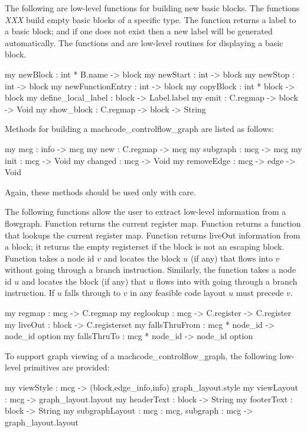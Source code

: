     The following are low-level functions for building new basic blocks.
The functions \emph{XXX} build empty basic blocks of a specific
type.  The function  returns a label to a basic block;
and if one does not exist then a new label will be generated automatically.
The functions  and  are low-level
routines for displaying a basic block.
\begin{SML}
   my newBlock          : int * B.name -> block      
   my newStart          : int -> block              
   my newStop           : int -> block             
   my newFunctionEntry  : int -> block            
   my copyBlock         : int * block -> block   
   my define_local_label       : block -> Label.label  
   my emit              : C.regmap -> block -> Void
   my show_block        : C.regmap -> block -> String 
\end{SML}

   Methods for building a machcode_controlflow_graph are listed as follows:
\begin{SML}
   my mcg      : info -> mcg    
   my new      : C.regmap -> mcg
   my subgraph : mcg -> mcg     
   my init     : mcg -> Void    
   my changed  : mcg -> Void   
   my removeEdge : mcg -> edge -> Void
\end{SML}
 Again, these methods should be used only with care.

  The following functions allow the user to extract low-level information
from a flowgraph.  Function  returns the current register map.
Function  returns a function that lookups the current register
map.  Function  returns liveOut information from a block;
it returns the empty registerset if the block is not an escaping block.
Function  takes a node id $v$ and locates the
block $u$ (if any) that flows into $v$ without going through a branch
instruction.  Similarly, the function   takes
a node id $u$ and locates the block (if any) that $u$ flows into
with going through a branch instruction.  If $u$ falls through to
$v$ in any feasible code layout $u$ must precede $v$.
\begin{SML}
   my regmap    : mcg -> C.regmap
   my reglookup : mcg -> C.register -> C.register
   my liveOut   : block -> C.registerset
   my fallsThruFrom : mcg * node_id -> node_id option
   my fallsThruTo   : mcg * node_id -> node_id option
\end{SML}

   To support graph viewing of a machcode_controlflow_graph, the following low-level
primitives are provided: 
\begin{SML}
   my viewStyle      : mcg -> (block,edge_info,info) graph_layout.style
   my viewLayout     : mcg -> graph_layout.layout
   my headerText     : block -> String
   my footerText     : block -> String
   my subgraphLayout : { mcg : mcg, subgraph : mcg } -> graph_layout.layout
\end{SML}

